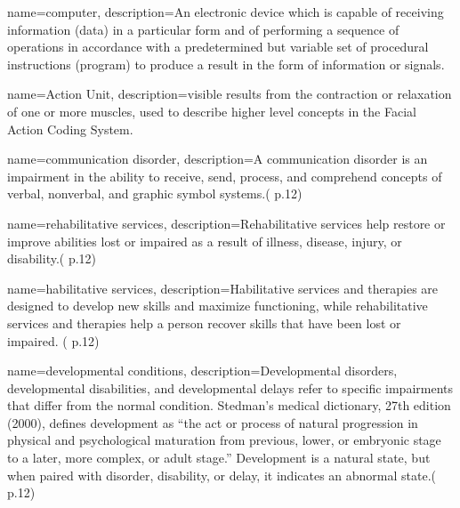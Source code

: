  {
	name={computer}, 
	description={An electronic device which is capable of receiving information (data) in a particular form and of performing a sequence of operations in accordance with a predetermined but variable set of procedural instructions (program) to produce a result in the form of information or signals.
}
}

 {
	name={Action Unit}, 
	description={visible results from the contraction or relaxation of one or more muscles, used to describe higher level concepts in the Facial Action Coding System.}	
}


 {
	name={communication disorder}, 
	description={A communication disorder is an impairment in the ability to receive, send, process, and comprehend concepts of verbal, nonverbal, and graphic symbol systems.(\cite{SLPathologies} p.12)
}
}

 {
	name={rehabilitative services}, 
	description={Rehabilitative services help restore or improve abilities lost or impaired as a result of illness, disease, injury, or disability.(\cite{SLPathologies} p.12)
}
}

 {
	name={habilitative services}, 
	description={Habilitative services and therapies are designed to develop new skills and maximize functioning, while rehabilitative services and therapies help a person recover skills that have been lost or impaired. (\cite{SLPathologies} p.12)
}
}

 {
	name={developmental conditions}, 
	description={Developmental disorders, developmental disabilities, and developmental delays refer to specific impairments that differ from the normal condition. Stedman’s medical dictionary, 27th edition (2000), defines development as “the act or process of natural progression in physical and psychological maturation from previous, lower, or embryonic stage to a later, more complex, or adult stage.” Development is a natural state, but when paired with disorder, disability, or delay, it indicates an abnormal state.(\cite{SLPathologies} p.12)
}
}

